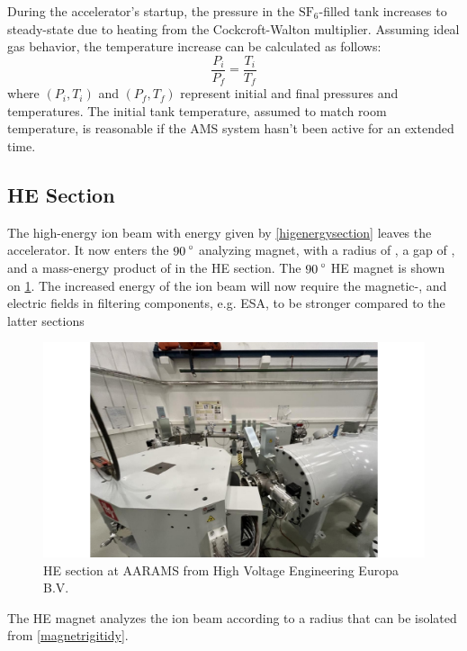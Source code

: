 During the accelerator's startup, the pressure in the \(\text{SF}_{6}\)-filled tank increases to steady-state due to heating from the Cockcroft-Walton multiplier. Assuming ideal gas behavior, the temperature increase can be calculated as follows:
\begin{equation}
    \frac{P_i}{P_f} = \frac{T_i}{T_f}
\end{equation}
where \((P_i, T_i)\) and \((P_f, T_f)\) represent initial and final pressures and temperatures. The initial tank temperature, assumed to match room temperature, is reasonable if the AMS system hasn’t been active for an extended time.



\subsection{HE Section}
The high-energy ion beam with energy given by \cref{higenergysection} leaves the accelerator. It now enters the $\ce{90^{\circ}}$ analyzing magnet, with a radius of \ce{850mm}, a gap of \ce{50mm}, and a mass-energy product of  in the HE section. 
The $\ce{90^{\circ}}$ HE magnet is shown on \cref{fig:HEAARASM.pdf}.
The increased energy of the ion beam will now require the magnetic-, and electric fields in filtering components, e.g. ESA, to be stronger compared to the latter sections

\begin{figure}
    \centering
    \includegraphics[width=1\linewidth]{B/HEAARASM.pdf}
    \caption{HE section at AARAMS from High Voltage Engineering Europa B.V.}
    \label{fig:HEAARASM.pdf}
\end{figure}

The HE magnet analyzes the ion beam according to a radius that can be isolated from \cref{magnetrigitidy}.

